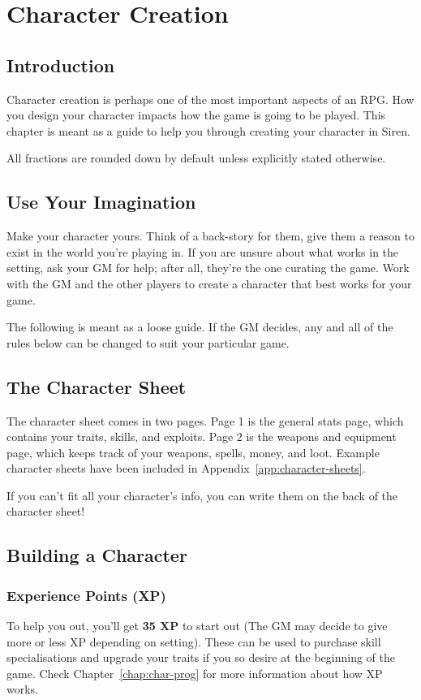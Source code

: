 \chapter{Character Creation}\label{chap:char-creat}
\section{Introduction}
Character creation is perhaps one of the most important aspects of an RPG.
How you design your character impacts how the game is going to be played.
This chapter is meant as a guide to help you through creating your character in Siren.

\note All fractions are rounded down by default unless explicitly stated otherwise.

\section{Use Your Imagination}
Make your character yours.
Think of a back-story for them, give them a reason to exist in the world you're playing in.
If you are unsure about what works in the setting, ask your GM for help; after all, they're the one curating the game.
Work with the GM and the other players to create a character that best works for your game.

\note The following is meant as a loose guide.
If the GM decides, any and all of the rules below can be changed to suit your particular game.

\section{The Character Sheet}
The character sheet comes in two pages.
Page 1 is the general stats page, which contains your traits, skills, and exploits.
Page 2 is the weapons and equipment page, which keeps track of your weapons, spells, money, and loot.
Example character sheets have been included in Appendix~\ref{app:character-sheets}.

\note If you can't fit all your character's info, you can write them on the back of the character sheet!

\section{Building a Character}
\subsection{Experience Points (XP)}
To help you out, you'll get \textbf{35 XP} to start out (The GM may decide to give more or less XP depending on setting).
These can be used to purchase skill specialisations and upgrade your traits if you so desire at the beginning of the game.
Check Chapter~\ref{chap:char-prog} for more information about how XP works.

